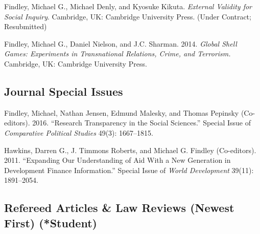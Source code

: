 \documentclass[10pt]{article}
\begin{document}
\begin{etaremune}

\item Findley, Michael G., Michael Denly, and Kyosuke Kikuta. \textit{External Validity for Social Inquiry}. Cambridge, UK: Cambridge University Press. (Under Contract; Resubmitted)

\item Findley, Michael G., Daniel Nielson, and J.C. Sharman. 2014. \textit{Global Shell Games: Experiments in Transnational Relations, Crime, and Terrorism.} Cambridge, UK: Cambridge University Press. 


\end{etaremune}


\noindent \subsection*{Journal Special Issues}

\begin{etaremune}

\item Findley, Michael, Nathan Jensen, Edmund Malesky, and Thomas Pepinsky (Co-editors). 2016. ``Research Transparency in the Social Sciences.'' Special Issue of \textit{Comparative Political Studies} 49(3): 1667--1815.


\item Hawkins, Darren G., J. Timmons Roberts, and Michael G. Findley (Co-editors). 2011. ``Expanding Our Understanding of Aid With a New Generation in Development Finance Information.'' Special Issue of \textit{World Development} 39(11): 1891--2054. 

\end{etaremune}


\subsection*{Refereed Articles \& Law Reviews (Newest First) (*Student)}    
\end{document}
